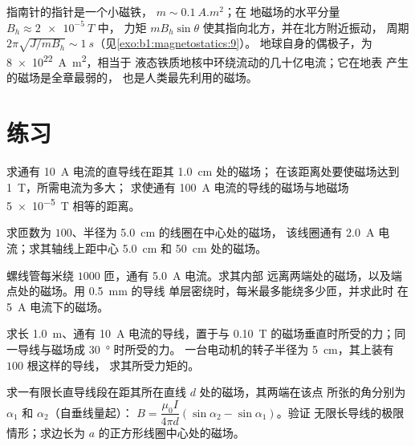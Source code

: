 \begin{example}[指南针与地球]\label{ex:b1:magnetostatics:compass}
指南针的指针是一个小磁铁， $m \sim \qty{0.1}{A.m^2}$；在
地磁场的水平分量 $B_h \approx \qty{2e-5}{T}$ 中，
力矩 $mB_h\sin\theta$ 使其指向北方，并在北方附近振动，
周期 $2\pi\sqrt{J/mB_h} \sim \qty{1}{s}$（见\cref{exo:b1:magnetostatics:9}）。
地球自身的偶极子，为 \qty{8e22}{A.m^2}，相当于
液态铁质地核中环绕流动的几十亿电流；它在地表
产生的磁场是全章最弱的，
也是人类最先利用的磁场。
\end{example}

\section{练习}

\begin{exercise}[$\star$]\label{exo:b1:magnetostatics:1}
求通有 \qty{10}{A} 电流的直导线在距其 \qty{1.0}{cm} 处的磁场；
在该距离处要使磁场达到 \qty{1}{T}，所需电流为多大；
求使通有 \qty{100}{A} 电流的导线的磁场与地磁场 \qty{5e-5}{T} 相等的距离。
\end{exercise}

\begin{exercise}[$\star$]\label{exo:b1:magnetostatics:2}
求匝数为 $100$、半径为 \qty{5.0}{cm} 的线圈在中心处的磁场，
该线圈通有 \qty{2.0}{A} 电流；求其轴线上距中心
\qty{5.0}{cm} 和 \qty{50}{cm} 处的磁场。
\end{exercise}

\begin{exercise}[$\star$]\label{exo:b1:magnetostatics:3}
螺线管每米绕 $1000$ 匝，通有 \qty{5.0}{A} 电流。求其内部
远离两端处的磁场，以及端点处的磁场。用 \qty{0.5}{mm} 的导线
单层密绕时，每米最多能绕多少匝，并求此时
在 \qty{5}{A} 电流下的磁场。
\end{exercise}

\begin{exercise}[$\star$]\label{exo:b1:magnetostatics:4}
求长 \qty{1.0}{m}、通有 \qty{10}{A} 电流的导线，置于与
\qty{0.10}{T} 的磁场垂直时所受的力；同一导线与磁场成 \qty{30}{\degree} 时所受的力。
一台电动机的转子半径为 \qty{5}{cm}，其上装有 $100$ 根这样的导线，
求其所受力矩的。
\end{exercise}

\begin{exercise}[$\star\star$]\label{exo:b1:magnetostatics:5}
求一有限长直导线段在距其所在直线 $d$ 处的磁场，其两端在该点
所张的角分别为 $\alpha_1$ 和 $\alpha_2$（自垂线量起）：
$B = \dfrac{\mu_0I}{4\pi d}(\sin\alpha_2 - \sin\alpha_1)$。验证
无限长导线的极限情形；求边长为
$a$ 的正方形线圈中心处的磁场。
\end{exercise}

